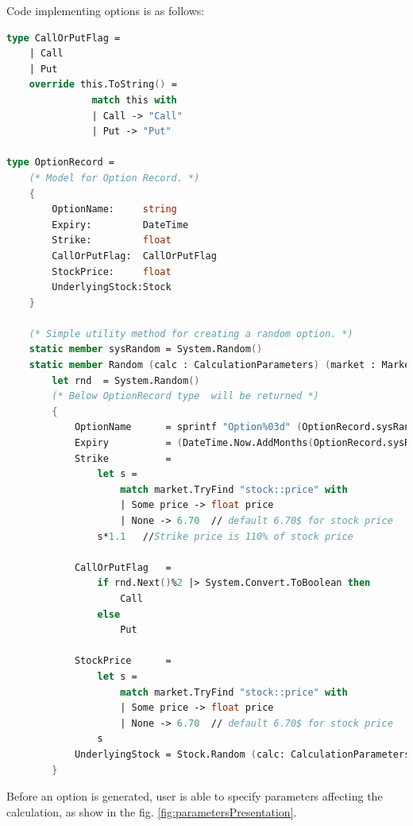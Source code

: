     Code implementing options is as follows:
    \begin{lstlisting}[language=FSharp, label={lst:option}, caption=F\# implementation of an option.]
type CallOrPutFlag =
    | Call
    | Put
    override this.ToString() =
               match this with
               | Call -> "Call"
               | Put -> "Put"
               
type OptionRecord =
    (* Model for Option Record. *)
    {
        OptionName:     string
        Expiry:         DateTime
        Strike:         float
        CallOrPutFlag:  CallOrPutFlag
        StockPrice:     float
        UnderlyingStock:Stock
    }

    (* Simple utility method for creating a random option. *)
    static member sysRandom = System.Random()
    static member Random (calc : CalculationParameters) (market : MarketData) =
        let rnd  = System.Random()
        (* Below OptionRecord type  will be returned *)
        {
            OptionName      = sprintf "Option%03d" (OptionRecord.sysRandom.Next(999))
            Expiry          = (DateTime.Now.AddMonths(OptionRecord.sysRandom.Next(2, 12))).Date
            Strike          =
                let s =
                    match market.TryFind "stock::price" with
                    | Some price -> float price
                    | None -> 6.70  // default 6.70$ for stock price
                s*1.1   //Strike price is 110% of stock price
            
            CallOrPutFlag   = 
                if rnd.Next()%2 |> System.Convert.ToBoolean then
                    Call
                else
                    Put
            
            StockPrice      =
                let s =
                    match market.TryFind "stock::price" with
                    | Some price -> float price
                    | None -> 6.70  // default 6.70$ for stock price
                s
            UnderlyingStock = Stock.Random (calc: CalculationParameters) (market : MarketData)
        }
    \end{lstlisting}
    Before an option is generated, user is able to specify parameters affecting the calculation, as show in the fig. \ref{fig:parametersPresentation}.
